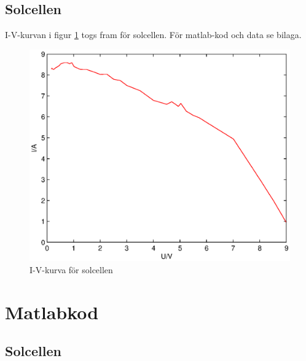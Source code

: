 \documentclass[a4paper]{article}
\begin{document}
\subsection{Solcellen}
I-V-kurvan i figur \ref{solcelliv} togs fram för solcellen. För matlab-kod och data se bilaga.
\begin{figure}[H]
	\centering
	\includegraphics[scale=.7]{solcell.eps}
	\caption{I-V-kurva för solcellen}
	\label{solcelliv}
\end{figure}
\newpage
\appendix
\section{Matlabkod}
\subsection{Solcellen}


\newpage
\end{document}
